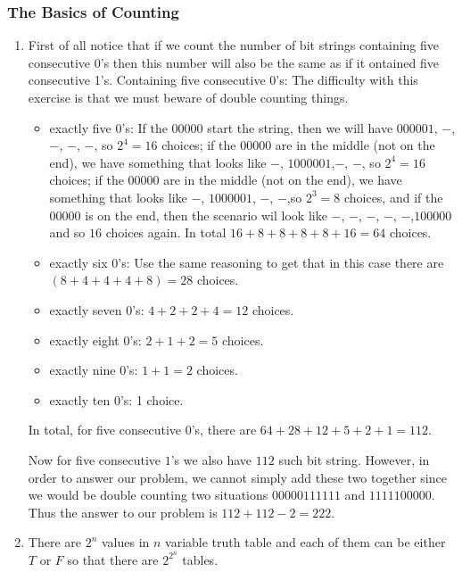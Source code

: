 \documentclass{sig-alternate-05-2015}
\begin{document}
\subsubsection{The Basics of Counting}
\begin{enumerate}
	\item First of all notice that if we count the number of bit strings containing five consecutive 0's then this number will also be the same as if it ontained five consecutive 1's.
		Containing five consecutive $0$'s: The difficulty with this exercise is that we must beware of double counting things.
		\begin{itemize}
			\item exactly five $0$'s: If the $00000$ start the string, then we will have $000001$, $-$, $-$, $-$, $-$, so $2^4=16$ choices; if the $00000$ are in the middle (not on the end), we have something that looks like $-$, $1000001$,$-$, $-$, so $2^4=16$ choices; if the $00000$ are in the middle (not on the end), we have something that looks like $-$, $1000001$, $-$, $-$,so $2^3=8$ choices, and if the $00000$ is on the end, then the scenario wil look like $-$, $-$, $-$, $-$, $-$,$100000$ and so $16$ choices again. In total $16+8+8+8+8+16=64$ choices.
			\item exactly six $0$'s: Use the same reasoning to get that in this case there are $(8+4+4+4+8)=28$ choices.
			\item exactly seven $0$'s: $4+2+2+4=12$ choices.
			\item exactly eight $0$'s: $2+1+2=5$ choices.
			\item exactly nine $0$'s: $1+1=2$ choices.
			\item exactly ten $0$'s: 1 choice.
		\end{itemize}
		
		In total, for five consecutive $0$'s, there are $64+28+12+5+2+1=112$.
		
		Now for five consecutive $1$'s we also have $112$ such bit string. However, in order to answer our problem, we cannot simply add these two together since we would be double counting two situations $00000111111$ and $1111100000$. Thus the answer to our problem is $112+112-2=222$.

	\item There are $2^n$ values in $n$ variable truth table and each of them can be either $T$ or $F$ so that there are $2^{2^n}$ tables.
\end{enumerate}
\end{document}
